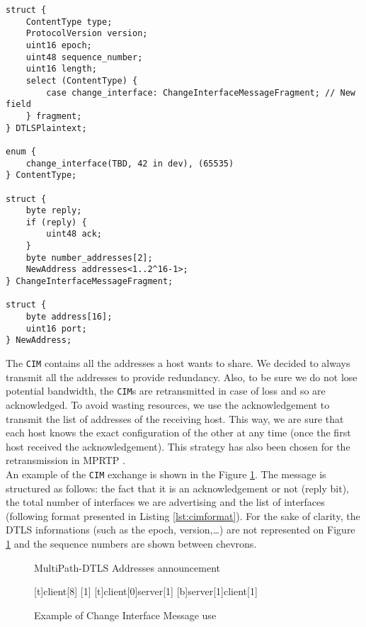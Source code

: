 \begin{lstlisting}[caption=Change Interface Message, label=lst:cimformat]
struct {
    ContentType type;
    ProtocolVersion version;
    uint16 epoch;
    uint48 sequence_number;
    uint16 length;
    select (ContentType) {
        case change_interface: ChangeInterfaceMessageFragment; // New field
    } fragment;
} DTLSPlaintext;

enum {
    change_interface(TBD, 42 in dev), (65535)
} ContentType;

struct {
    byte reply;
    if (reply) {
        uint48 ack;
    }
    byte number_addresses[2];
    NewAddress addresses<1..2^16-1>;
} ChangeInterfaceMessageFragment;

struct {
    byte address[16];
    uint16 port;
} NewAddress;
\end{lstlisting}

The \texttt{CIM} contains all the addresses a host wants to share. We decided to always transmit all the addresses to provide redundancy. Also, to be sure we do not lose potential bandwidth, the \texttt{CIM}s are retransmitted in case of loss and so are acknowledged. To avoid wasting resources, we use the acknowledgement to transmit the list of addresses of the receiving host. This way, we are sure that each host knows the exact configuration of the other at any time (once the first host received the acknowledgement). This strategy has also been chosen for the retransmission in MPRTP \cite{singh-avtcore-mprtp}.\\

An example of the \texttt{CIM} exchange is shown in the Figure \ref{fig:CIMexchange}. The message is structured as follows: the fact that it is an acknowledgement or not (reply bit), the total number of interfaces we are advertising and the list of interfaces (following format presented in Listing \ref{lst:cimformat}). For the sake of clarity, the DTLS informations (such as the epoch, version,\dots) are not represented on Figure \ref{fig:CIMexchange} and the sequence numbers are shown between chevrons.

\begin{figure}[!h]
\centering
\begin{msc}[r]{MultiPath-DTLS Addresses announcement}

\setlength{\instfootheight}{0em}
\setlength{\instheadheight}{0em}
\setlength{\instdist}{0.7\linewidth}
\setlength{\levelheight}{3em}


[t]{}{client}[8]
[1]
\nextlevel
{}[t]{client}[0]{server}[1]
\nextlevel
{}[b]{server}[1]{client}[1]
\nextlevel
\nextlevel

\end{msc}
\caption{Example of Change Interface Message use}
\label{fig:CIMexchange}
\end{figure}

